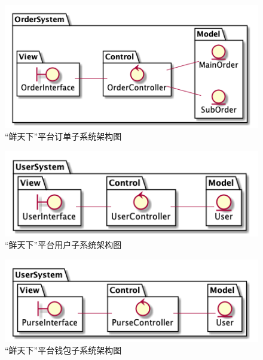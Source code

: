    \begin{figure}[htp]
        \centering
        \includegraphics[width=12cm]{report/figure/subsystem/OrderSystem.png}
        \caption{“鲜天下”平台订单子系统架构图}
        \label{fig:OrderSystem}
    \end{figure}
    
    \begin{figure}[htp]
        \centering
        \includegraphics[width=12cm]{report/figure/subsystem/UserSystem.png}
        \caption{“鲜天下”平台用户子系统架构图}
        \label{fig:UserSystem}
    \end{figure}
    
    \begin{figure}[htp]
        \centering
        \includegraphics[width=12cm]{report/figure/subsystem/PurseSystem.png}
        \caption{“鲜天下”平台钱包子系统架构图}
        \label{fig:PurseSystem}
    \end{figure}

